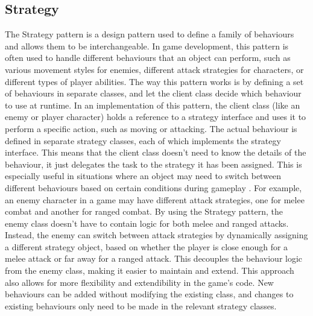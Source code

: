 \documentclass[10pt]{final_report}
\begin{document}
\subsection{Strategy}\label{strategy}
The Strategy pattern is a design pattern used to define a family of behaviours and allows them to be interchangeable. In game development, this pattern is often used to handle different behaviours that an object can perform, such as various movement styles for enemies, different attack strategies for characters, or different types of player abilities. The way this pattern works is by defining a set of behaviours in separate classes, and let the client class decide which behaviour to use at runtime.
\newline
In an implementation of this pattern, the client class (like an enemy or player character) holds a reference to a strategy interface and uses it to perform a specific action, such as moving or attacking. The actual behaviour is defined in separate strategy classes, each of which implements the strategy interface. This means that the client class doesn't need to know the details of the behaviour, it just delegates the task to the strategy it has been assigned. This is especially useful in situations where an object may need to switch between different behaviours based on certain conditions during gameplay \cite{Doran2017}.
\newline
For example, an enemy character in a game may have different attack strategies, one for melee combat and another for ranged combat. By using the Strategy pattern, the enemy class doesn’t have to contain logic for both melee and ranged attacks. Instead, the enemy can switch between attack strategies by dynamically assigning a different strategy object, based on whether the player is close enough for a melee attack or far away for a ranged attack. This decouples the behaviour logic from the enemy class, making it easier to maintain and extend. This approach also allows for more flexibility and extendibility in the game's code. New behaviours can be added without modifying the existing class, and changes to existing behaviours only need to be made in the relevant strategy classes. 
\end{document}
